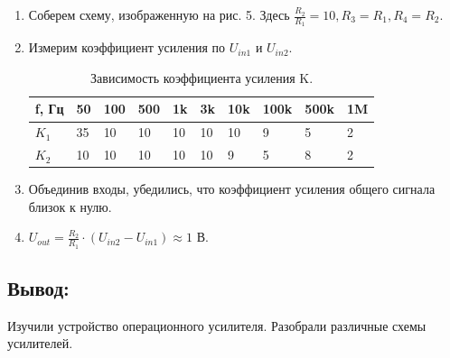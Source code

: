 \documentclass[a4paper]{article}
\begin{document}
\begin{enumerate}
    \item Соберем схему, изображенную на рис. 5. Здесь $\frac{R_2}{R_1} = 10, R_3 = R_1, R_4 =R_2$.
    \item Измерим коэффициент усиления по $U_{in1} $ и $U_{in2}$. 
     
    \begin{table}[H]
        \centering
        \begin{center}
        \end{center}
        \vspace{0.1cm}
        \label{tab:my_label}
        \begin{tabular}{|p{2cm}|p{1cm}|p{1cm}|p{1cm}|p{1cm}|p{1cm}|p{1cm}|p{1cm}|p{1cm}|p{1cm}|}
            \hline
            f, Гц & 50 & 100  & 500 & 1k & 3k & 10k & 100k & 500k  & 1M  \\ 
            \hline
            $K_1$   & 35 &  10  &  10 & 10  & 10  & 10 &  9 &  5 & 2 \\
            \hline
            $K_2$  & 10 &   10 &   10  & 10  & 10  & 9 &  5 &  8 & 2 \\
            \hline
            \end{tabular}
            \caption{Зависимость коэффициента усиления K.}
    \end{table}

    \item  Объединив входы, убедились, что коэффициент усиления общего сигнала близок к нулю.
    \item $U_{out} = \frac{R_2}{R_1}\cdot(U_{in2} - U_{in1}) \approx 1$ В.

\end{enumerate}

\subsection{Вывод:}
Изучили устройство операционного усилителя. Разобрали различные схемы усилителей.
\end{document}
